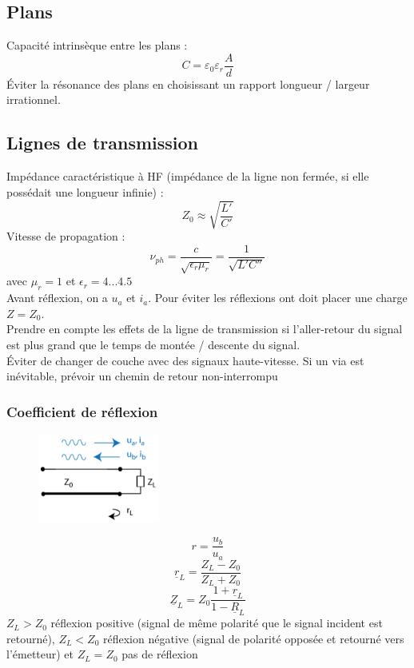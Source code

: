 \documentclass[resume]{subfiles}
\begin{document}
\begin{multicols}{3}
\subsection{Plans}
Capacité intrinsèque entre les plans :
$$C=\varepsilon_0\varepsilon_r\frac{A}{d}$$
Éviter la résonance des plans en choisissant un rapport longueur / largeur irrationnel.
\subsection{Lignes de transmission}
Impédance caractéristique à HF (impédance de la ligne non fermée, si elle possédait une longueur infinie) :
$$Z_0\approx \sqrt{\frac{L'}{C'}} $$
Vitesse de propagation :
$$\nu_{ph} = \frac{c}{\sqrt{\epsilon_r \mu_r}} = \frac{1}{\sqrt{L' C''}}$$ avec $\mu_r = 1$ et $\epsilon_r =4...4.5$\\
Avant réflexion, on a $u_a$ et $i_a$. Pour éviter les réflexions ont doit placer une charge $Z=Z_0$.\\
Prendre en compte les effets de la ligne de transmission si l'aller-retour du signal est plus grand que le temps de montée / descente du signal.\\
Éviter de changer de couche avec des signaux haute-vitesse. Si un via est inévitable, prévoir un chemin de retour non-interrompu
\subsubsection{Coefficient de réflexion}
\begin{figure}[H]
\centering
\includegraphics[width=4.00cm]{img_13.png}
\end{figure}
$$r=\frac{u_b}{u_a}$$
$$\underline{r}_L=\frac{Z_L-Z_0}{Z_L+Z_0}$$
$$\underline{Z}_L=Z_0\frac{1+\underline{r}_L}{1-\underline{R}_L}$$
$Z_L>Z_0$ réflexion positive (signal de même polarité que le signal incident est retourné), $Z_L<Z_0$ réflexion négative (signal de polarité opposée et retourné vers l'émetteur) et $Z_L=Z_0$ pas de réflexion\\

\end{multicols}
\end{document}
